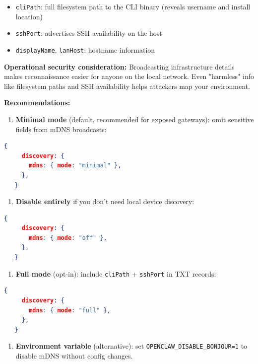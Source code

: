 \begin{itemize}
  \item \texttt{cliPath}: full filesystem path to the CLI binary (reveals username and install location)
  \item \texttt{sshPort}: advertises SSH availability on the host
  \item \texttt{displayName}, \texttt{lanHost}: hostname information
\end{itemize}


\textbf{Operational security consideration:} Broadcasting infrastructure details makes reconnaissance easier for anyone on the local network. Even "harmless" info like filesystem paths and SSH availability helps attackers map your environment.

\textbf{Recommendations:}

\begin{enumerate}
  \item \textbf{Minimal mode} (default, recommended for exposed gateways): omit sensitive fields from mDNS broadcasts:
\end{enumerate}


\begin{lstlisting}[language=json]
   {
     discovery: {
       mdns: { mode: "minimal" },
     },
   }
\end{lstlisting}


\begin{enumerate}
  \item \textbf{Disable entirely} if you don't need local device discovery:
\end{enumerate}


\begin{lstlisting}[language=json]
   {
     discovery: {
       mdns: { mode: "off" },
     },
   }
\end{lstlisting}


\begin{enumerate}
  \item \textbf{Full mode} (opt-in): include \texttt{cliPath} + \texttt{sshPort} in TXT records:
\end{enumerate}


\begin{lstlisting}[language=json]
   {
     discovery: {
       mdns: { mode: "full" },
     },
   }
\end{lstlisting}


\begin{enumerate}
  \item \textbf{Environment variable} (alternative): set \texttt{OPENCLAW\_DISABLE\_BONJOUR=1} to disable mDNS without config changes.
\end{enumerate}


